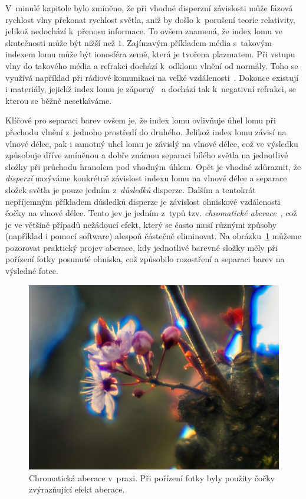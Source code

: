 V~minulé kapitole bylo zmíněno, že při vhodné
disperzní závislosti může fázová rychlost vlny
překonat rychlost světla, aniž by došlo k~porušení
teorie relativity, jelikož nedochází k~přenosu
informace. To ovšem znamená, že index lomu ve
skutečnosti může být nižší než $1$. Zajímavým
příkladem média s~takovým indexem lomu může být
ionosféra země, která je tvořena plazmatem.
Při vstupu vlny do takového média a refrakci
dochází k~odklonu vlnění od normály. 
Toho se využívá
například při rádiové komunikaci na velké
vzdálenosti~\cite{wiki_refractive_idx}.
Dokonce existují i materiály, jejichž index
lomu je záporný~\cite{wiki_negative_index}
a dochází tak k~negativní refrakci, se kterou
se běžně nesetkáváme.

Klíčové pro separaci barev ovšem je, že
index lomu ovlivňuje úhel lomu při přechodu
vlnění z~jednoho prostředí do druhého. Jelikož
index lomu závisí na vlnové délce, pak i samotný
uhel lomu je závislý na vlnové délce, což ve
výsledku způsobuje dříve zmíněnou a dobře známou
separaci bílého světla na jednotlivé složky při
průchodu hranolem pod vhodným úhlem. Opět je vhodné
zdůraznit, že \textit{disperzí} nazýváme konkrétně
závislost indexu lomu na vlnové délce a separace
složek světla je pouze jedním z~\textit{důsledků}
disperze. Dalším a tentokrát nepříjemným příkladem
důsledků disperze je závislost ohniskové vzdálenosti
čočky na vlnové délce. Tento jev je jedním z~typů
tzv. \textit{chromatické aberace}~\cite{wiki_aberration},
což je ve většině případů nežádoucí efekt, 
který se často musí různými způsoby (například i
pomocí software) alespoň částečně eliminovat.
Na obrázku~\ref{fig:aberration} můžeme pozorovat
praktický projev aberace, kdy jednotlivé barevné
složky měly při pořízení fotky posunuté ohniska, což
způsobilo rozostření a separaci barev na výsledné fotce.
\begin{figure}[htbp]
    \centering
    \includegraphics[scale=0.20]{img/aberration.jpeg}
    \caption{Chromatická aberace v~praxi. Při
    pořízení fotky byly použity čočky zvýrazňující
    efekt aberace.}
    \label{fig:aberration}
\end{figure}

